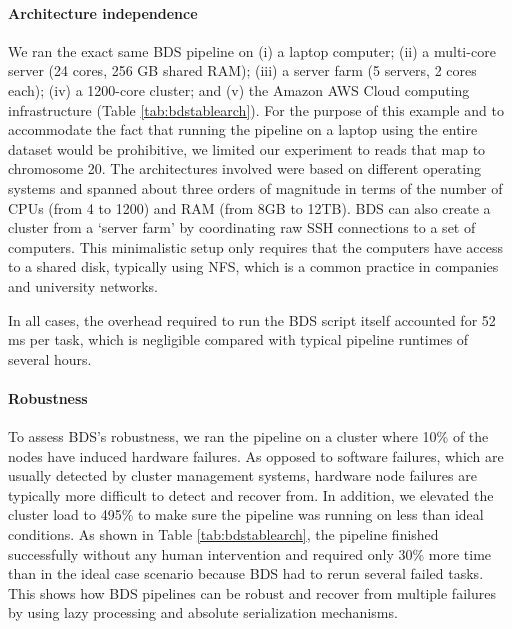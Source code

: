 
\paragraph{Architecture independence} We ran the exact same BDS pipeline on (i) a laptop computer; (ii) a multi-core server (24 cores, 256 GB shared RAM); (iii) a server farm (5 servers, 2 cores each); (iv) a 1200-core cluster; and (v) the Amazon AWS Cloud computing infrastructure (Table \ref{tab:bdstablearch}). For the purpose of this example and to accommodate the fact that running the pipeline on a laptop using the entire dataset would be prohibitive, we limited our experiment to reads that map to chromosome 20. The architectures involved were based on different operating systems and spanned about three orders of magnitude in terms of the number of CPUs (from 4 to 1200) and RAM (from 8GB to 12TB). BDS can also create a cluster from a ‘server farm’ by coordinating raw SSH connections to a set of computers. This minimalistic setup only requires that the computers have access to a shared disk, typically using NFS, which is a common practice in companies and university networks.

In all cases, the overhead required to run the BDS script itself accounted for 52 ms per task, which is negligible compared with typical pipeline runtimes of several hours.

\paragraph{Robustness} To assess BDS’s robustness, we ran the pipeline on a cluster where 10\% of the nodes have induced hardware failures. As opposed to software failures, which are usually detected by cluster management systems, hardware node failures are typically more difficult to detect and recover from. In addition, we elevated the cluster load to 495\% to make sure the pipeline was running on less than ideal conditions. As shown in Table \ref{tab:bdstablearch}, the pipeline finished successfully without any human intervention and required only 30\% more time than in the ideal case scenario because BDS had to rerun several failed tasks. This shows how BDS pipelines can be robust and recover from multiple failures by using lazy processing and absolute serialization mechanisms.

